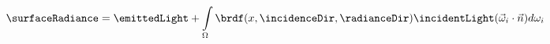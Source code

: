 %
%

\begin{figure}[!htp]
  \begin{equation}
    \surfaceRadiance = \emittedLight +
      \int\limits_{\Omega} \brdf(x, \incidenceDir, \radianceDir)\incidentLight (\vec\omega_i \cdot \vec{n}) d \omega_i
  \label{eq:render}
  \end{equation}
\end{figure}
